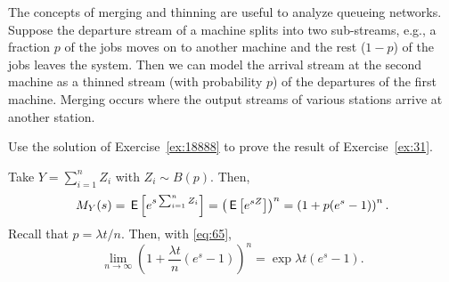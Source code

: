 The concepts of merging and thinning are  useful to analyze queueing
  networks. Suppose the departure stream of a machine splits into
  two sub-streams, e.g., a fraction $p$ of the jobs moves on to another
  machine and the rest ($1-p$) of the jobs leaves the system. Then we
  can model the arrival stream at the second machine as a thinned
  stream (with probability $p$) of the departures of the first
  machine. Merging occurs where the output streams of various stations arrive at another station. 

\begin{exercise}\faFlask
Use the solution of Exercise~\ref{ex:18888} to prove the result of Exercise~\ref{ex:31}. 
\begin{solution}
Take $Y=\sum_{i=1}^n Z_i$ with $Z_i\sim B(p)$. Then, 
\begin{equation*}
M_Y(s) = \,\mathsf{E}\left[e^{s\sum_{i=1}^n Z_i}\right] = \left(\,\mathsf{E}\left[e^{s Z}\right]\right)^n = \left(1 + p (e^s - 1)\right)^n. 
\end{equation*}
Recall that $p= \lambda t/ n$. Then, with \eqref{eq:65},
\begin{equation*}
\lim_{n\to\infty}  \left(1 + \frac{\lambda t}{n} (e^s - 1)\right)^n = \exp{\lambda t (e^s-1)}. 
\end{equation*}

\end{solution}

\end{exercise}





